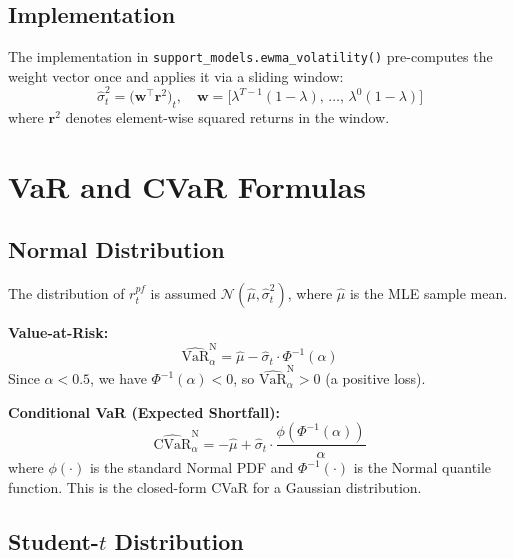 \documentclass[11pt, a4paper]{article}
\begin{document}
\subsection{Implementation}

The implementation in \texttt{support\_models.ewma\_volatility()} pre-computes
the weight vector once and applies it via a sliding window:
\begin{equation}
\hat{\sigma}_t^2 = \bigl(\mathbf{w}^\top \mathbf{r}^2\bigr)_t,
\quad
\mathbf{w} = \bigl[\lambda^{T-1}(1-\lambda),\, \ldots,\, \lambda^0(1-\lambda)\bigr]
\end{equation}
where $\mathbf{r}^2$ denotes element-wise squared returns in the window.

\section{VaR and CVaR Formulas}

\subsection{Normal Distribution}

The distribution of $r_t^{pf}$ is assumed $\mathcal{N}(\hat{\mu}, \hat{\sigma}_t^2)$,
where $\hat{\mu}$ is the MLE sample mean.

\textbf{Value-at-Risk:}
\begin{equation}
\widehat{\text{VaR}}_\alpha^{\text{N}}
= \hat{\mu} - \hat{\sigma}_t \cdot \Phi^{-1}(\alpha)
\label{eq:ewma_var_norm}
\end{equation}
Since $\alpha < 0.5$, we have $\Phi^{-1}(\alpha) < 0$, so
$\widehat{\text{VaR}}_\alpha^{\text{N}} > 0$ (a positive loss).

\textbf{Conditional VaR (Expected Shortfall):}
\begin{equation}
\widehat{\text{CVaR}}_\alpha^{\text{N}}
= -\hat{\mu} + \hat{\sigma}_t \cdot \frac{\phi\!\left(\Phi^{-1}(\alpha)\right)}{\alpha}
\label{eq:ewma_cvar_norm}
\end{equation}
where $\phi(\cdot)$ is the standard Normal PDF and $\Phi^{-1}(\cdot)$ is the
Normal quantile function. This is the closed-form CVaR for a Gaussian distribution.

\subsection{Student-$t$ Distribution}
\end{document}
